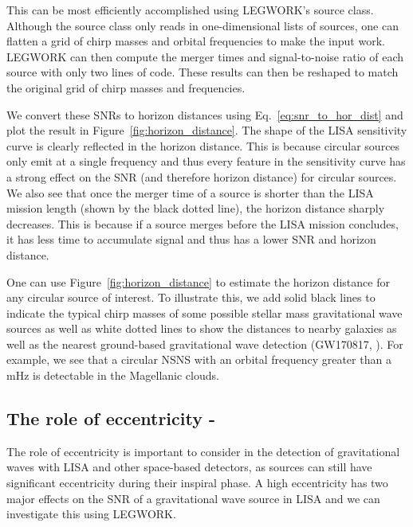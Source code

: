\documentclass[twocolumn]{aastex631}
\newcommand{\lw}{LEGWORK}
\newcommand{\lwColour}{SeaGreen}
\newcommand{\tutorialIcon}{{\color{\lwColour}{\faLaptopCode}}}
\newcommand{\tutorialLink}[1]{\href{#1}{\tutorialIcon}}
\begin{document}
This can be most efficiently accomplished using \lw{}'s source class. Although the source class only reads in one-dimensional lists of sources, one can flatten a grid of chirp masses and orbital frequencies to make the input work. \lw{} can then compute the merger times and signal-to-noise ratio of each source with only two lines of code. These results can then be reshaped to match the original grid of chirp masses and frequencies.

We convert these SNRs to horizon distances using Eq.~\ref{eq:snr_to_hor_dist} and plot the result in Figure~\ref{fig:horizon_distance}. The shape of the LISA sensitivity curve is clearly reflected in the horizon distance. This is because circular sources only emit at a single frequency and thus every feature in the sensitivity curve has a strong effect on the SNR (and therefore horizon distance) for circular sources. We also see that once the merger time of a source is shorter than the LISA mission length (shown by the black dotted line), the horizon distance sharply decreases. This is because if a source merges before the LISA mission concludes, it has less time to accumulate signal and thus has a lower SNR and horizon distance.

One can use Figure~\ref{fig:horizon_distance} to estimate the horizon distance for any circular source of interest. To illustrate this, we add solid black lines to indicate the typical chirp masses of some possible stellar mass gravitational wave sources as well as white dotted lines to show the distances to nearby galaxies as well as the nearest ground-based gravitational wave detection (GW170817, \citealp{Abbott+2017_GW170817}). For example, we see that a circular NSNS with an orbital frequency greater than a mHz is detectable in the Magellanic clouds.

\subsection{The role of eccentricity\texorpdfstring{ - \tutorialLink{https://legwork.readthedocs.io/en/latest/demos/TheRoleofEccentricity.html}}{}}\label{sec:eccentricity_role}

The role of eccentricity is important to consider in the detection of gravitational waves with LISA and other space-based detectors, as sources can still have significant eccentricity during their inspiral phase. A high eccentricity has two major effects on the SNR of a gravitational wave source in LISA and we can investigate this using \lw{}.
\end{document}
